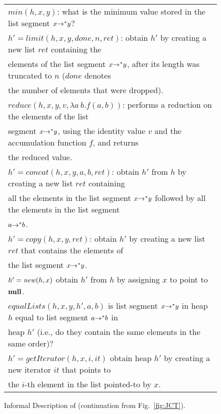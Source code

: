 \documentclass[runningheads,a4paper]{llncs}
\newcommand*{\extended}{}
\begin{document}
\begin{figure*}[!hbt]
{\begin{tabular}{l}
$min(h,x,y)$: what is the minimum value stored in the list segment $x {\rightarrow^*} y$?\\
$h'=limit(h,x,y,done,n,ret)$: obtain $h'$ by creating a new list $ret$ containing the\\ elements of the list segment $x {\rightarrow^*} y$, after its length was truncated to $n$ ($done$ denotes\\ the number of elements that were dropped).\\
$reduce(h,x,y,v,\lambda a ~b. f(a,b))$: 
performs a reduction on the elements of the list\\ segment $x {\rightarrow^*} y$, using the identity value $v$ and the accumulation function $f$, and returns\\ the reduced value.\\
$h'=concat(h,x,y,a,b,ret)$: obtain $h'$ from $h$ by creating a new list $ret$ containing\\ all the elements in the list segment 
$x {\rightarrow^*} y$  followed by all the elements in the list segment\\ $a {\rightarrow^*} b$.\\
$h' = copy(h,x,y,ret)$: obtain $h'$ by creating a new list $ret$ that contains the elements of\\ the list segment $x {\rightarrow^*} y$.\\
$h' = \mathit{new}(h, x)$ obtain $h'$ from $h$ by assigning $x$ to point to $\mathbf{null}$.\\
$equalLists(h,x,y,h',a,b)$ is list segment $x {\rightarrow^*} y$ in heap $h$ equal to list segment  $a {\rightarrow^*} b$ in\\ heap $h'$ (i.e., do they contain the same elements in the same order)?\\
$h' = getIterator(h,x,i,it)$ obtain heap $h'$ by creating a new iterator $it$ that points to\\ the $i$-th element in the list pointed-to by $x$.   
\end{tabular}
}
\caption{Informal Description of \logic (continuation from Fig.~\ref{fig:JCT}).}
\label{fig-appendix:JCT}
\end{figure*}
\end{document}

